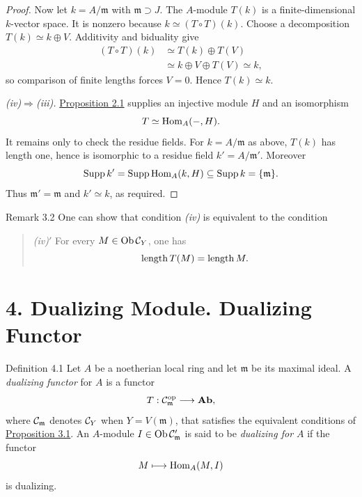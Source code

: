 \begin{proof}
Now let $k=A/\mathfrak m$ with $\mathfrak m\supset J$. The $A$-module
$T(k)$ is a finite-dimensional $k$-vector space. It is nonzero because
$k\simeq(T\circ T)(k)$. Choose a decomposition $T(k)\simeq k\oplus V$.
Additivity and biduality give
\[
\begin{aligned}
  (T\circ T)(k)
    &\simeq T(k)\oplus T(V)\\
    &\simeq k\oplus V\oplus T(V)\simeq k,
\end{aligned}
\]
so comparison of finite lengths forces $V=0$. Hence $T(k)\simeq k$.

\smallskip\noindent
\emph{(iv)$\Rightarrow$(iii).}
\hyperref[IV.2.1]{Proposition 2.1} supplies an injective module $H$ and an isomorphism
\[
  T\simeq\operatorname{Hom}_A(-,H).
\]
It remains only to check the residue fields.
For $k=A/\mathfrak m$ as above, $T(k)$ has length one, hence is isomorphic
to a residue field $k'=A/\mathfrak m'$. Moreover
\[
  \operatorname{Supp} k'=\operatorname{Supp}\operatorname{Hom}_A(k,H)\subseteq\operatorname{Supp} k=\{\mathfrak m\}.
\]
Thus $\mathfrak m'=\mathfrak m$ and $k'\simeq k$, as required.
\end{proof}


\begin{sgastatement}{Remark 3.2}
One can show that condition \emph{(iv)} is equivalent to the condition
\begin{quote}
\emph{(iv)$'$} For every $M\in\operatorname{Ob}\mathcal C_Y$, one has
\[
  \operatorname{length} T(M)=\operatorname{length} M.
\]
\end{quote}
\end{sgastatement}

\section*{4. Dualizing Module. Dualizing Functor}

\begin{sgastatement}{Definition 4.1}
Let $A$ be a noetherian local ring and let $\mathfrak m$ be its maximal
ideal. A \emph{dualizing functor} for $A$ is a functor
\[
  T:\mathcal C_{\mathfrak m}^{\mathrm{op}}\longrightarrow\mathbf{Ab},
\]
where $\mathcal C_{\mathfrak m}$ denotes $\mathcal C_Y$ when
$Y=V(\mathfrak m)$, that satisfies the equivalent conditions of
\hyperref[IV.3.1]{Proposition 3.1}. An $A$-module $I\in\operatorname{Ob}\mathcal C'_{\mathfrak m}$ is said to be \emph{dualizing for
$A$} if the functor
\[
  M\longmapsto\operatorname{Hom}_A(M,I)
\]
is dualizing.
\end{sgastatement}

